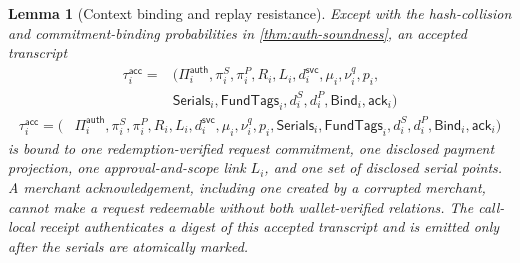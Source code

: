 \documentclass[letterpaper]{article}
\newtheorem{lemma}{Lemma}
\begin{document}
\begin{lemma}[Context binding and replay resistance]
\label{lem:replay}
Except with the hash-collision and commitment-binding probabilities in
\cref{thm:auth-soundness}, an accepted transcript
\ifdefined\MMAAAITwoColumn
\begin{equation}
\begin{aligned}
  \tau_i^{\mathsf{acc}}={}&
  (\Pi_i^{\mathsf{auth}},\pi_i^S,\pi_i^P,R_i,L_i,
   d_i^{\mathsf{svc}},\mu_i,\nu_i^q,p_i,\\
  &\mathsf{Serials}_i,\mathsf{FundTags}_i,d_i^S,d_i^P,
   \mathsf{Bind}_i,\mathsf{ack}_i)
\end{aligned}
\end{equation}
\else
\begin{equation}
\begin{aligned}
  \tau_i^{\mathsf{acc}}=
  (&\Pi_i^{\mathsf{auth}},\pi_i^S,\pi_i^P,R_i,L_i,d_i^{\mathsf{svc}},\mu_i,\nu_i^q,p_i,\mathsf{Serials}_i,\mathsf{FundTags}_i,
   d_i^S,d_i^P,\mathsf{Bind}_i,\mathsf{ack}_i)
\end{aligned}
\end{equation}
\fi
is bound to one redemption-verified request commitment, one disclosed payment
projection, one approval-and-scope link $L_i$, and one set of disclosed serial points.
A merchant acknowledgement, including one created by a corrupted merchant,
cannot make a request redeemable without both wallet-verified relations. The
call-local receipt authenticates a digest of this accepted transcript and is
emitted only after the serials are atomically marked.
\end{lemma}
\end{document}
